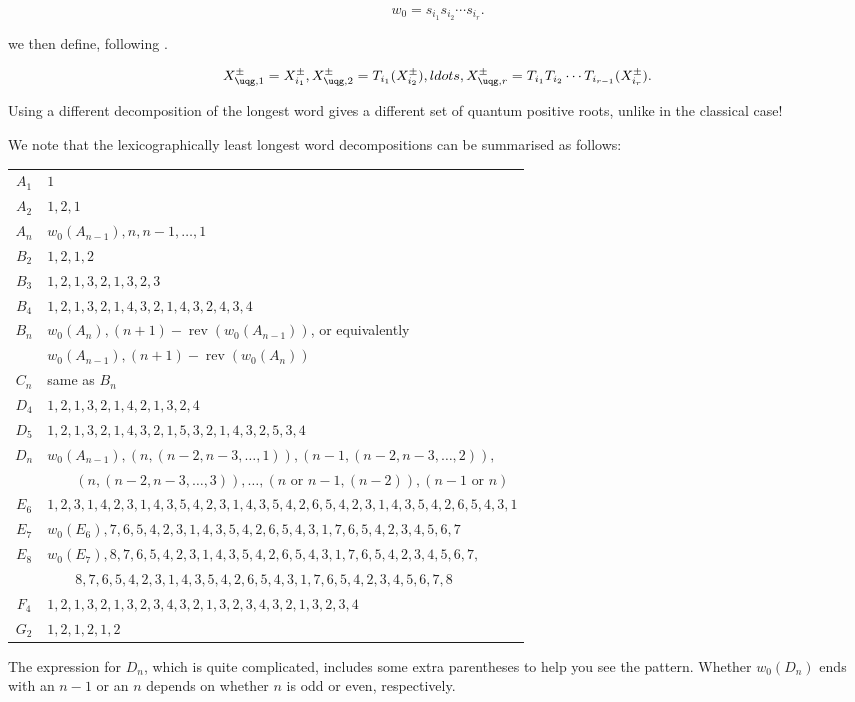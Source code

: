 $$ w_0 = s_{i_1} s_{i_2} \cdots s_{i_r}.$$

we then define, following \cite{CP}.

$$X_{\uqg, 1}^\pm = X_{i_1}^\pm, X_{\uqg, 2}^\pm = T_{i_1}(X_{i_2}^\pm), ldots, X_{\uqg, r}^\pm = T_{i_1}T_{i_2}\cdots T_{i_{r-1}}(X_{i_r}^\pm).$$

Using a different decomposition of the longest word gives a different set of quantum positive roots, unlike in the classical case! \cite[\S8.1B]{CP}

We note that the lexicographically least longest word decompositions can be summarised as follows:
\begin{center}
\begin{tabular}{c|l}
$A_1$ & $1$ \\
$A_2$ & $1,2,1$ \\
$A_n$ & $w_0(A_{n-1}),n,n-1,\ldots,1$ \\
$B_2$ & $1,2,1,2$ \\
$B_3$ & $1,2,1,3,2,1,3,2,3$ \\
$B_4$ & $1,2,1,3,2,1,4,3,2,1,4,3,2,4,3,4$ \\
$B_n$ & $w_0(A_n),(n+1)-\operatorname{rev}(w_0(A_{n-1}))$, or equivalently\\
      & $w_0(A_{n-1}),(n+1)-\operatorname{rev}(w_0(A_n))$ \\
$C_n$ & same as $B_n$ \\
$D_4$ & $1,2,1,3,2,1,4,2,1,3,2,4$ \\
$D_5$ & $1,2,1,3,2,1,4,3,2,1,5,3,2,1,4,3,2,5,3,4$ \\
$D_n$ & $w_0(A_{n-1}),(n,(n-2,n-3,\ldots,1)),(n-1,(n-2,n-3,\ldots,2)),$ \\
      & $\qquad(n,(n-2,n-3,\ldots,3)),\ldots,(n\text{ or }n-1,(n-2)),(n-1\text{ or }n)$ \\
$E_6$ & $1,2,3,1,4,2,3,1,4,3,5,4,2,3,1,4,3,5,4,2,6,5,4,2,3,1,4,3,5,4,2,6,5,4,3,1$\\
$E_7$ & $w_0(E_6), 7, 6, 5, 4, 2, 3, 1, 4, 3, 5, 4, 2, 6, 5, 4, 3, 1, 7, 6, 5, 4, 2, 3, 4, 5, 6, 7$ \\
$E_8$ & $w_0(E_7), 8, 7, 6, 5, 4, 2, 3, 1, 4, 3, 5, 4, 2, 6, 5, 4, 3, 1, 7, 6, 5, 4, 2, 3, 4, 5, 6, 7, $ \\
      & $\qquad    8, 7, 6, 5, 4, 2, 3, 1, 4, 3, 5, 4, 2, 6, 5, 4, 3, 1, 7, 6, 5, 4, 2, 3, 4, 5, 6, 7, 8$ \\
$F_4$ & $1,2,1,3,2,1,3,2,3,4,3,2,1,3,2,3,4,3,2,1,3,2,3,4$ \\
$G_2$ & $1,2,1,2,1,2$
\end{tabular}
\end{center}
The expression for $D_n$, which is quite complicated, includes some extra parentheses to help you see the pattern. Whether $w_0(D_n)$ ends with an
$n-1$ or an $n$ depends on whether $n$ is odd or even, respectively.

